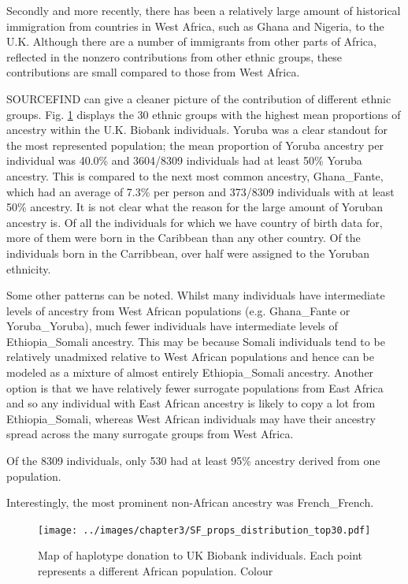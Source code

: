 Secondly and more recently, there has been a relatively large amount of historical immigration from countries in West Africa, such as Ghana and Nigeria, to the U.K. Although there are a number of immigrants from other parts of Africa, reflected in the nonzero contributions from other ethnic groups, these contributions are small compared to those from West Africa.

SOURCEFIND can give a cleaner picture of the contribution of different ethnic groups. Fig. \ref{fig:SF_props_distribution_top30} displays the 30 ethnic groups with the highest mean proportions of ancestry within the U.K. Biobank individuals. Yoruba was a clear standout for the most represented population; the mean proportion of Yoruba ancestry per individual was 40.0\% and 3604/8309 individuals had at least 50\% Yoruba ancestry. This is compared to the next most common ancestry, Ghana\_Fante, which had an average of 7.3\% per person and 373/8309 individuals with at least 50\% ancestry. It is not clear what the reason for the large amount of Yoruban ancestry is. Of all the individuals for which we have country of birth data for, more of them were born in the Caribbean than any other country. Of the individuals born in the Carribbean, over half were assigned to the Yoruban ethnicity.    

Some other patterns can be noted. Whilst many individuals have intermediate levels of ancestry from West African populations (e.g. Ghana\_Fante or Yoruba\_Yoruba), much fewer individuals have intermediate levels of Ethiopia\_Somali ancestry. This may be because Somali individuals tend to be relatively unadmixed relative to West African populations and hence can be modeled as a mixture of almost entirely Ethiopia\_Somali ancestry. Another option is that we have relatively fewer surrogate populations from East Africa and so any individual with East African ancestry is likely to copy a lot from Ethiopia\_Somali, whereas West African individuals may have their ancestry spread across the many surrogate groups from West Africa. 

Of the 8309 individuals, only 530 had at least 95\% ancestry derived from one population. 

Interestingly, the most prominent non-African ancestry was French\_French. 

\begin{figure}[htp]
    \centering
    \texttt{[image: ../images/chapter3/SF\_props\_distribution\_top30.pdf]}
    \caption{Map of haplotype donation to UK Biobank individuals. Each point represents a different African population. Colour }
    \label{fig:SF_props_distribution_top30}
\end{figure}


